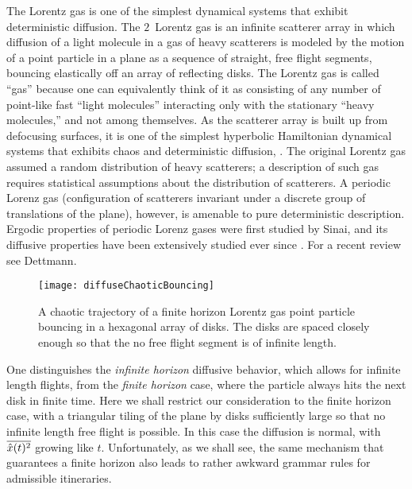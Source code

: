 The Lorentz gas is one of the simplest dynamical
systems that exhibit deterministic diffusion. The $2$\dmn\ Lorentz gas
is an infinite scatterer array in which diffusion of a light molecule
in a gas of heavy scatterers is modeled by the motion of a point
particle in a plane as a sequence of straight, free flight segments,
bouncing elastically off an array of reflecting disks. The Lorentz gas
is called ``gas'' because one can equivalently think of it as
consisting of any number of point-like fast ``light molecules''
interacting only with the stationary ``heavy molecules,'' and not
among themselves.  As the scatterer array is built up from defocusing
surfaces, it is one of the simplest hyperbolic Hamiltonian dynamical
systems that exhibits chaos and deterministic diffusion,
. The original Lorentz gas
assumed a random distribution of heavy scatterers; a description of
such gas requires statistical assumptions about the distribution of
scatterers. A periodic Lorenz gas (configuration of scatterers
invariant under a discrete group of translations of the plane),
however, is amenable to pure deterministic description. Ergodic
properties of periodic Lorenz gases were first studied by
Sinai, and its diffusive properties have been extensively
studied ever since%
.
 For a recent review  see Dettmann.

\begin{figure}[htbp]
	\begin{center}
		\texttt{[image: diffuseChaoticBouncing]}
	\end{center}
	\caption[]{\label{fig-chaoticBouncing}
		A chaotic trajectory of a finite horizon Lorentz gas
		point particle bouncing in a
		hexagonal array of disks. The disks are spaced closely enough
		so that the no free flight segment is of infinite length.
	}
\end{figure}

One distinguishes
the {\em infinite horizon} diffusive behavior, which allows for infinite
length flights, from
the {\em finite horizon} case, where the particle always
hits the next disk in finite time.
Here we shall restrict our consideration to the finite horizon case, with
a triangular tiling of the plane by disks sufficiently large so that no
infinite length free flight is possible. In this case the diffusion is
normal, with $\overline{\hat{x}(t)^2}$ growing like $t$.
Unfortunately, as we shall see,
the same mechanism that guarantees a finite horizon
also leads to rather awkward grammar rules for admissible itineraries.


